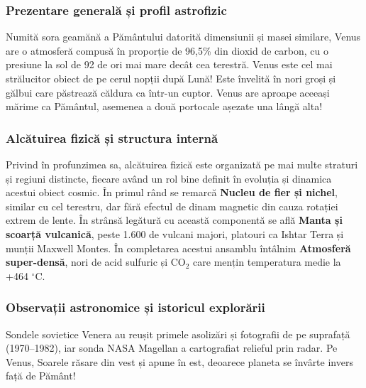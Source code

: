 \subsubsection*{Prezentare generală și profil astrofizic}
Numită sora geamănă a Pământului datorită dimensiunii și masei similare, Venus are o atmosferă compusă în proporție de 96,5\% din dioxid de carbon, cu o presiune la sol de 92 de ori mai mare decât cea terestră. Venus este cel mai strălucitor obiect de pe cerul nopții după Lună! Este învelită în nori groși și gălbui care păstrează căldura ca într-un cuptor. Venus are aproape aceeași mărime ca Pământul, asemenea a două portocale așezate una lângă alta!

\subsubsection*{Alcătuirea fizică și structura internă}
Privind în profunzimea sa, alcătuirea fizică este organizată pe mai multe straturi și regiuni distincte, fiecare având un rol bine definit în evoluția și dinamica acestui obiect cosmic. În primul rând se remarcă \textbf{Nucleu de fier și nichel}, similar cu cel terestru, dar fără efectul de dinam magnetic din cauza rotației extrem de lente. În strânsă legătură cu această componentă se află \textbf{Manta și scoarță vulcanică}, peste 1.600 de vulcani majori, platouri ca Ishtar Terra și munții Maxwell Montes. În completarea acestui ansamblu întâlnim \textbf{Atmosferă super-densă}, nori de acid sulfuric și CO$_2$ care mențin temperatura medie la +464 $^\circ$C.

\subsubsection*{Observații astronomice și istoricul explorării}
Sondele sovietice Venera au reușit primele asolizări și fotografii de pe suprafață (1970--1982), iar sonda NASA Magellan a cartografiat relieful prin radar. Pe Venus, Soarele răsare din vest și apune în est, deoarece planeta se învârte invers față de Pământ!

